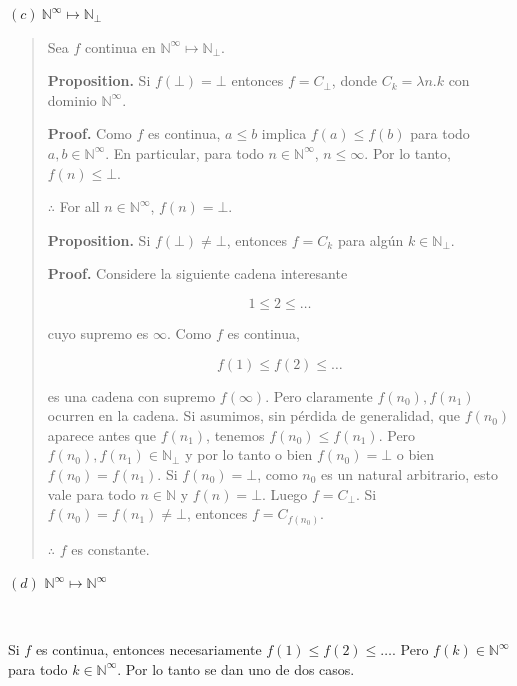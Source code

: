 \documentclass[article, 12pt]{article}
\begin{document}
\pagebreak

$(c) ~ \mathbb{N}^\infty \mapsto \mathbb{N}_\bot $


\small
\begin{quote}

Sea $f$ continua en $\mathbb{N}^\infty \mapsto \mathbb{N}_\bot$.

\textbf{Proposition.} Si $f(\bot ) = \bot $ entonces $f = C_\bot $, donde $C_k
=\lambda n . k$ con dominio $\mathbb{N}^\infty$.

\textbf{Proof.} Como $f$ es continua, $a \leq b$ implica $f(a) \leq f(b)$ para
todo $a, b \in \mathbb{N}^\infty$. En particular, para todo $n \in
\mathbb{N}^\infty$, $n \leq \infty$. Por lo tanto, $f(n) \leq \bot$. 

$\therefore $ For all $n \in \mathbb{N}^\infty$, $f(n) = \bot $.

\textbf{Proposition.} Si $f(\bot) \neq \bot$, entonces $f = C_k$ para algún $k
\in \mathbb{N}_\bot$.

\textbf{Proof.} Considere la siguiente cadena interesante

\begin{equation*}
  1 \leq 2 \leq \ldots
\end{equation*}

cuyo supremo es $\infty$. Como $f$ es continua, 

\begin{equation*}
  f(1) \leq f(2) \leq \ldots
\end{equation*}

es una cadena con supremo $f(\infty )$. Pero claramente $f(n_0), f(n_1)$ ocurren
en la cadena. Si asumimos, sin pérdida de generalidad, que $f(n_0)$ aparece
antes que $f(n_1)$, tenemos $f(n_0) \leq f(n_1)$. Pero $f(n_0), f(n_1) \in
\mathbb{N}_\bot $ y por lo tanto o bien $f(n_0) = \bot $ o bien $f(n_0) =
f(n_1)$. Si $f(n_0) = \bot$, como $n_0$ es un natural arbitrario, esto vale para
todo $n \in \mathbb{N}$ y $f(n) = \bot $. Luego $f = C_\bot $. Si $f(n_0) =
f(n_1) \neq \bot $, entonces $f = C_{f(n_0)}$.

$\therefore $ $f$ es constante.


\end{quote}
\normalsize



\pagebreak 

$(d)$ $\mathbb{N}^\infty \mapsto \mathbb{N}^\infty$

~

Si $f$ es continua, entonces necesariamente $f(1) \leq f(2) \leq \ldots$. Pero
$f(k) \in \mathbb{N}^\infty$ para todo $k \in \mathbb{N}^\infty$. Por lo tanto
se dan uno de dos casos.
\end{document}
